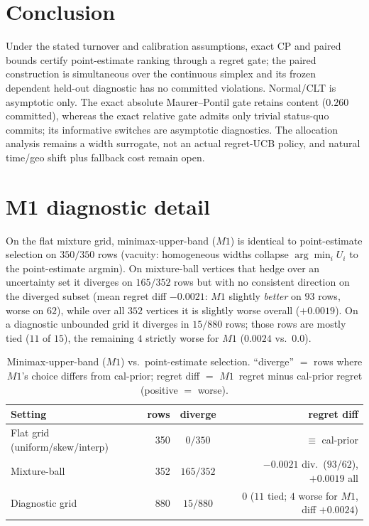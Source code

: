 \documentclass{article}
\begin{document}
\section{Conclusion}
\label{sec:concl}
Under the stated turnover and calibration assumptions, exact CP and paired bounds certify
point-estimate ranking through a regret gate; the paired construction is simultaneous over the
continuous simplex and its frozen dependent held-out diagnostic has no committed violations.
Normal/CLT is
asymptotic only. The exact absolute Maurer--Pontil gate retains content ($0.260$ committed),
whereas the exact relative gate admits only trivial status-quo commits; its informative
switches are asymptotic diagnostics. The allocation analysis remains a width surrogate, not an
actual regret-UCB policy, and natural time/geo shift plus fallback cost remain open.




\clearpage
\appendix

\section{M1 diagnostic detail}
\label{app:m1}
On the flat mixture grid, minimax-upper-band ($M1$) is identical to point-estimate selection
on $350/350$ rows (vacuity: homogeneous widths collapse $\arg\min_i U_i$ to the point-estimate
argmin). On mixture-ball vertices that hedge over an uncertainty set it diverges on $165/352$
rows but with no consistent direction on the diverged subset (mean regret diff $-0.0021$:
$M1$ slightly \emph{better} on $93$ rows, worse on $62$), while over all $352$ vertices it is
slightly worse overall ($+0.0019$). On a diagnostic unbounded grid it diverges in $15/880$
rows; those rows are mostly tied ($11$ of $15$), the remaining $4$ strictly worse for $M1$
($0.0024$ vs.\ $0.0$).

\begin{table}[h]
\centering\small
\begin{tabular}{lrcr}
\toprule
Setting & rows & diverge & regret diff \\
\midrule
Flat grid (uniform/skew/interp) & 350 & $0/350$ & $\equiv$ cal-prior \\
Mixture-ball & 352 & $165/352$ & $-0.0021$ div.\ ($93$/$62$), $+0.0019$ all \\
Diagnostic grid & 880 & $15/880$ & $0$ ($11$ tied; $4$ worse for $M1$, diff $+0.0024$) \\
\bottomrule
\end{tabular}
\caption{Minimax-upper-band ($M1$) vs.\ point-estimate selection. ``diverge'' $=$ rows where
$M1$'s choice differs from cal-prior; regret diff $=$ $M1$~regret minus cal-prior regret
(positive $=$ worse).}
\label{tab:m1}
\end{table}
\end{document}
